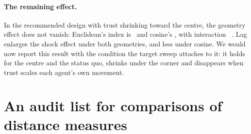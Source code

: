 \documentclass[11pt]{article}
\begin{document}
\paragraph{The remaining effect.}
In the recommended design with trust shrinking toward the centre, the geometry effect does not vanish: Euclidean's index is \VCRecommendedEucIdx\ and cosine's \VCRecommendedCosIdx, with interaction \VCRecommendedInter\ \VCRecommendedCI.
Lag enlarges the shock effect under both geometries, and less under cosine.
We would now report this result with the condition the target sweep attaches to it: it holds for the centre and the status quo, shrinks under the corner and disappears when trust scales each agent's own movement.

\section{An audit list for comparisons of distance measures}
\label{sec:protocol}
\end{document}
